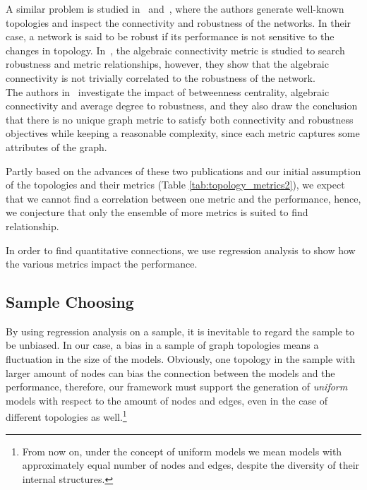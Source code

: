 A similar problem is studied in~\cite{algebraic1} and~\cite{algebraic2}, where the authors generate well-known topologies and inspect the connectivity and robustness of the networks. In their case, a network is said to be robust if its performance is not sensitive to the changes in topology. In~\cite{algebraic1}, the algebraic connectivity metric is studied to search robustness and metric relationships, however, they show that the algebraic connectivity is not trivially correlated to the robustness of the network.\\
The authors in~\cite{algebraic2} investigate the impact of betweenness centrality, algebraic connectivity and average degree to robustness, and they also draw the conclusion that there is no unique graph metric to satisfy both connectivity and robustness objectives while keeping a reasonable complexity, since each metric captures some attributes of the graph.

Partly based on the advances of these two publications and our initial assumption of the topologies and their metrics (Table \ref{tab:topology_metrics2}), we expect that we cannot find a correlation between one metric and the performance, hence, we conjecture that only the ensemble of more metrics is suited to find relationship.

In order to find quantitative connections, we use regression analysis to show how the various metrics impact the performance. 

\subsection{Sample Choosing}

By using regression analysis on a sample, it is inevitable to regard the sample to be unbiased. In our case, a bias in a sample of graph topologies means a fluctuation in the size of the models. Obviously, one topology in the sample with larger amount of nodes can bias the connection between the models and the performance, therefore, our framework must support the generation of \textit{uniform} models with respect to the amount of nodes and edges, even in the case of different topologies as well.\footnote{From now on, under the concept of uniform models we mean models with approximately equal number of nodes and edges, despite the diversity of their internal structures.}
